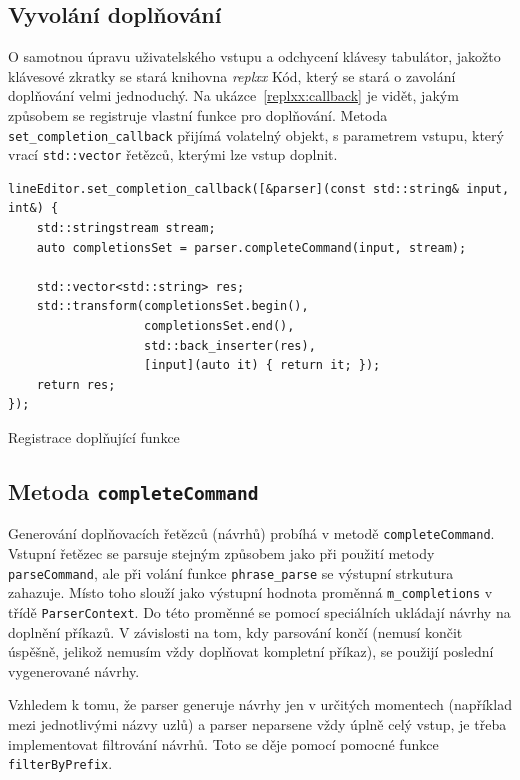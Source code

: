 \documentclass[thesis=B,czech,hidelinks]{FITthesis}[2019/03/06]
\begin{document}
\subsection{Vyvolání doplňování}
O samotnou úpravu uživatelského vstupu a odchycení klávesy tabulátor, jakožto klávesové zkratky se stará knihovna \textit{replxx} Kód, který se stará o zavolání doplňování velmi jednoduchý. Na ukázce~\ref{replxx:callback} je vidět, jakým způsobem se registruje vlastní funkce pro doplňování. Metoda \texttt{set\_completion\_callback} přijímá volatelný objekt, s parametrem vstupu, který vrací \texttt{std::vector} řetězců, kterými lze vstup doplnit.

\begin{listing}
\begin{verbatim}
lineEditor.set_completion_callback([&parser](const std::string& input, int&) {
    std::stringstream stream;
    auto completionsSet = parser.completeCommand(input, stream);

    std::vector<std::string> res;
    std::transform(completionsSet.begin(),
                   completionsSet.end(),
                   std::back_inserter(res),
                   [input](auto it) { return it; });
    return res;
});
\end{verbatim}
\caption{Registrace doplňující funkce}\label{replxx:callback}
\end{listing}

\subsection{Metoda \texttt{completeCommand}}
Generování doplňovacích řetězců (návrhů) probíhá v metodě \texttt{completeCommand}. Vstupní řetězec se parsuje stejným způsobem jako při použití metody \texttt{parseCommand}, ale při volání funkce \texttt{phrase\_parse} se výstupní strkutura zahazuje. Místo toho slouží jako výstupní hodnota proměnná \texttt{m\_completions} v třídě \texttt{ParserContext}. Do této proměnné se pomocí speciálních  ukládají návrhy na doplnění příkazů. V závislosti na tom, kdy parsování končí (nemusí končit úspěšně, jelikož nemusím vždy doplňovat kompletní příkaz), se použijí poslední vygenerované návrhy.

Vzhledem k tomu, že parser generuje návrhy jen v určitých momentech (například mezi jednotlivými názvy uzlů) a parser neparsene vždy úplně celý vstup, je třeba implementovat filtrování návrhů. Toto se děje pomocí pomocné funkce \texttt{filterByPrefix}.
\end{document}
